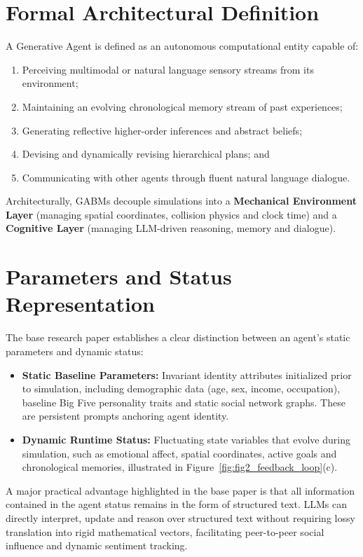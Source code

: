 \documentclass[12pt,a4paper]{report}
\begin{document}
\section{Formal Architectural Definition}
\label{sec:ga_def}

A Generative Agent is defined as an autonomous computational entity capable of:
\begin{enumerate}[label=\arabic*.]
    \item Perceiving multimodal or natural language sensory streams from its environment;
    \item Maintaining an evolving chronological memory stream of past experiences;
    \item Generating reflective higher-order inferences and abstract beliefs;
    \item Devising and dynamically revising hierarchical plans; and
    \item Communicating with other agents through fluent natural language dialogue.
\end{enumerate}

Architecturally, GABMs decouple simulations into a \textbf{Mechanical Environment Layer} (managing spatial coordinates, collision physics and clock time) and a \textbf{Cognitive Layer} (managing LLM-driven reasoning, memory and dialogue).

\section{Parameters and Status Representation}
\label{sec:parameters_status}

The base research paper establishes a clear distinction between an agent's static parameters and dynamic status:
\begin{itemize}
    \item \textbf{Static Baseline Parameters:} Invariant identity attributes initialized prior to simulation, including demographic data (age, sex, income, occupation), baseline Big Five personality traits and static social network graphs. These are persistent prompts anchoring agent identity.
    \item \textbf{Dynamic Runtime Status:} Fluctuating state variables that evolve during simulation, such as emotional affect, spatial coordinates, active goals and chronological memories, illustrated in Figure~\ref{fig:fig2_feedback_loop}(c).
\end{itemize}

A major practical advantage highlighted in the base paper is that all information contained in the agent status remains in the form of structured text. LLMs can directly interpret, update and reason over structured text without requiring lossy translation into rigid mathematical vectors, facilitating peer-to-peer social influence and dynamic sentiment tracking.
\end{document}
